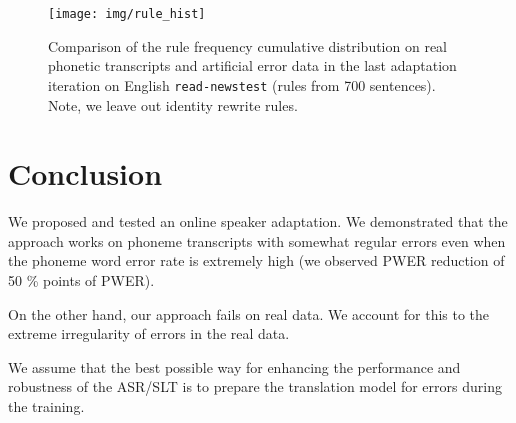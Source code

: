 \begin{figure}[h]
    \texttt{[image: img/rule\_hist]}
    \caption{Comparison of the rule frequency cumulative distribution on real phonetic transcripts and artificial error data in the last adaptation iteration on English \texttt{read-newstest} (rules from 700 sentences). Note, we leave out identity rewrite rules.}
    \label{fig:rule_hist} 
\end{figure}

\section{Conclusion}
\label{oeasr:conclusion}
We proposed and tested an online speaker adaptation. We demonstrated that the approach works on phoneme transcripts with somewhat regular errors even when the phoneme word error rate is extremely high (we observed PWER reduction of 50 \% points of PWER). 

On the other hand, our approach fails on real data. We account for this to the extreme irregularity of errors in the real data. 

We assume that the best possible way for enhancing the performance and robustness of the ASR/SLT is to prepare the translation model for errors during the training. 


